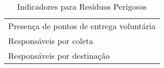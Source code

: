 \begin{table}[h!]
  \centering
  \caption{Indicadores para Resíduos Perigosos}
    \begin{tabular}{|p{22.43em}|}
    \rowcolor[rgb]{ .984,  .831,  .706} \multicolumn{1}{p{22.43em}}{RESÍDUOS PERIGOSOS} \\
    \midrule
    Presença de pontos de entrega voluntária \\
    \midrule
    Responsáveis por coleta \\
    \midrule
    Responsáveis por destinação \\
    \bottomrule
    \end{tabular}%
  \label{tab:ind_rp}%
\end{table}%
